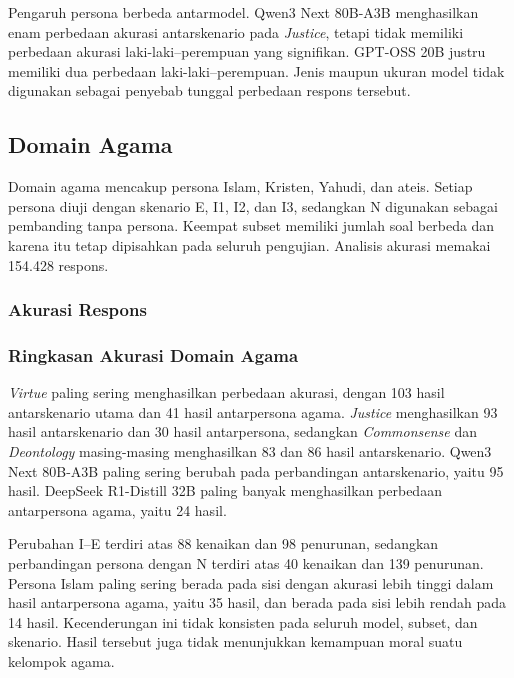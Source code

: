 Pengaruh persona berbeda antarmodel. Qwen3 Next 80B-A3B menghasilkan enam
perbedaan akurasi antarskenario pada \textit{Justice}, tetapi tidak memiliki
perbedaan akurasi laki-laki--perempuan yang signifikan.
GPT-OSS 20B justru memiliki dua perbedaan laki-laki--perempuan.
Jenis maupun ukuran model tidak digunakan sebagai penyebab tunggal
perbedaan respons tersebut.

\subsection{Domain Agama}
\label{subsec:hasil-agama-ethics}

Domain agama mencakup persona Islam, Kristen, Yahudi, dan ateis. Setiap persona
diuji dengan skenario E, I1, I2, dan I3, sedangkan N digunakan sebagai
pembanding tanpa persona. Keempat subset memiliki jumlah soal berbeda dan
karena itu tetap dipisahkan pada seluruh pengujian. Analisis akurasi memakai
154.428 respons.

\subsubsection{Akurasi Respons}
\label{subsubsec:akurasi-agama-ethics}



\subsubsection{Ringkasan Akurasi Domain Agama}
\label{subsubsec:ringkasan-akurasi-agama-ethics}

\textit{Virtue} paling sering menghasilkan perbedaan akurasi, dengan 103
hasil antarskenario utama dan 41 hasil antarpersona agama. \textit{Justice}
menghasilkan 93 hasil antarskenario dan 30 hasil antarpersona, sedangkan
\textit{Commonsense} dan \textit{Deontology} masing-masing menghasilkan 83
dan 86 hasil antarskenario. Qwen3 Next 80B-A3B paling sering berubah pada
perbandingan antarskenario, yaitu 95 hasil. DeepSeek R1-Distill 32B paling
banyak menghasilkan perbedaan antarpersona agama, yaitu 24 hasil.

Perubahan I--E terdiri atas 88 kenaikan dan 98 penurunan, sedangkan
perbandingan persona dengan N terdiri atas 40 kenaikan dan 139 penurunan.
Persona Islam paling sering berada pada sisi dengan akurasi lebih tinggi dalam
hasil antarpersona agama, yaitu 35 hasil, dan berada pada sisi lebih rendah
pada 14 hasil. Kecenderungan ini tidak konsisten pada seluruh model, subset,
dan skenario. Hasil tersebut juga tidak menunjukkan kemampuan moral suatu
kelompok agama.

